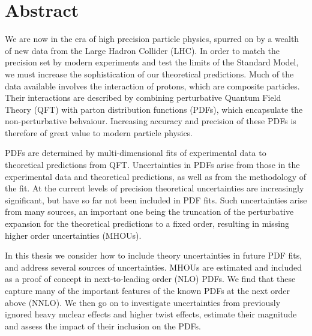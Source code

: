 \chapter{Abstract}

We are now in the era of high precision particle physics, spurred on by a wealth of new data from the Large Hadron Collider (LHC). In order to match the precision set by modern experiments and test the limits of the Standard Model, we must increase the sophistication of our theoretical predictions. Much of the data available involves the interaction of protons, which are composite particles. Their interactions are described by combining perturbative Quantum Field Theory (QFT) with parton distribution functions (PDFs), which encapsulate the non-perturbative behvaiour. Increasing accuracy and precision of these PDFs is therefore of great value to modern particle physics.

PDFs are determined by multi-dimensional fits of experimental data to theoretical predictions from QFT. Uncertainties in PDFs arise from those in the experimental data and theoretical predictions, as well as from the methodology of the fit. At the current levels of precision theoretical uncertainties are increasingly significant, but have so far not been included in PDF fits. Such uncertainties arise from many sources, an important one being the truncation of the perturbative expansion for the theoretical predictions to a fixed order, resulting in missing higher order uncertainties (MHOUs). 

In this thesis we consider how to include theory uncertainties in future PDF fits, and address several sources of uncertainties. MHOUs are estimated and included as a proof of concept in next-to-leading order (NLO) PDFs. We find that these capture many of the important features of the known PDFs at the next order above (NNLO). We then go on to investigate uncertainties from previously ignored heavy nuclear effects and higher twist effects, estimate their magnitude and assess the impact of their inclusion on the PDFs.